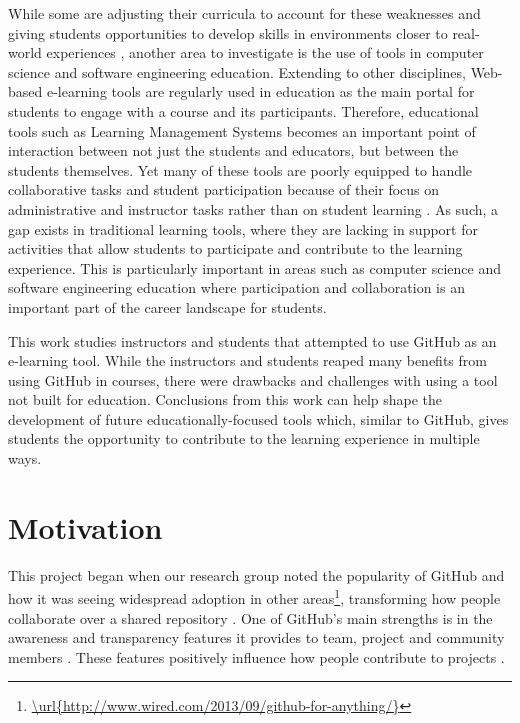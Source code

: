 While some are adjusting their curricula to account for these weaknesses \cite{jazayeri2004education} and giving students opportunities to develop skills in environments closer to real-world experiences \cite{coleman2012collaboration}, another area to investigate is the use of tools in computer science and software engineering education. Extending to other disciplines, Web-based e-learning tools are regularly used in education as the main portal for students to engage with a course and its participants. Therefore, educational tools such as Learning Management Systems becomes an important point of interaction between not just the students and educators, but between the students themselves. Yet many of these tools are poorly equipped to handle collaborative tasks and student participation because of their focus on administrative and instructor tasks rather than on student learning \cite{mcloughlin2007social}. As such, a gap exists in traditional learning tools, where they are lacking in support for activities that allow students to participate and contribute to the learning experience. This is particularly important in areas such as computer science and software engineering education where participation and collaboration is an important part of the career landscape for students.


This work studies instructors and students that attempted to use GitHub as an e-learning tool. While the instructors and students reaped many benefits from using GitHub in courses, there were drawbacks and challenges with using a tool not built for education. Conclusions from this work can help shape the development of future educationally-focused tools which, similar to GitHub, gives students the opportunity to contribute to the learning experience in multiple ways.

\section{Motivation}
This project began when our research group noted the popularity of GitHub and how it was seeing widespread adoption in other areas\footnote{\url{\url{http://www.wired.com/2013/09/github-for-anything/}}}, transforming how people collaborate over a shared repository \cite{begel2013social}. One of GitHub's main strengths is in the awareness and transparency features it provides to team, project and community members \cite{dabbish2012social}. These features positively influence how people contribute to projects \cite{Tsay:2012:SMS:2141512.2141583}.

